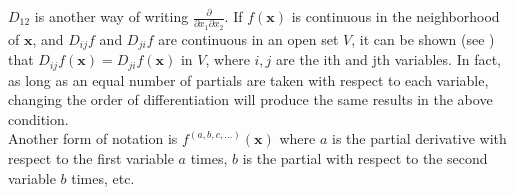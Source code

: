 \documentclass{article}
\begin{document}
$D_{12}$ is another way of writing $\frac{\partial}{\partial x_1 \partial x_2}$. If $f(\mathbf{x})$ is continuous in the neighborhood of $\mathbf{x}$,
and $D_{ij}f$ and $D_{ji}f$ are continuous in an open set $V$,  it can be shown 
(see ) that $D_{ij}f(\mathbf{x}) = D_{ji}f(\mathbf{x})$ in $V$, where $i,j$ are the ith and jth variables. In fact, as long as an equal number of partials are taken with respect to each variable, changing the order of differentiation will produce the same results in the above condition.\\
Another form of notation is $f^{(a,b,c,...)}(\mathbf{x})$ where $a$ is the partial derivative with respect to the first variable $a$ times, $b$ is the partial with respect to the second variable $b$ times, etc.
\end{document}
